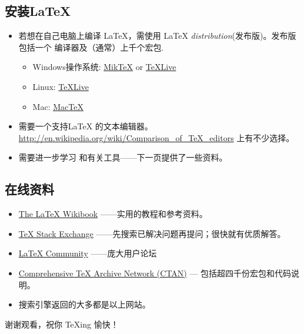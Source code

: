 \documentclass{beamer}
\begin{document}
\subsection{安装\LaTeX{}}
\begin{frame}{\insertsubsection}
\begin{itemize}
\item 若想在自己电脑上编译 \LaTeX{}，需使用 \LaTeX{}
\emph{distribution}(发布版)。发布版包括一个  编译器及（通常）上千个宏包.
\begin{itemize}
\item Windows操作系统: \href{http://miktex.org/}{Mik\TeX} or \href{http://tug.org/texlive/}{\TeX Live}
\item Linux: \href{http://tug.org/texlive/}{\TeX Live}
\item Mac: \href{http://tug.org/mactex/}{Mac\TeX}
\end{itemize}
\item 需要一个支持\LaTeX{} 的文本编辑器。\url{http://en.wikipedia.org/wiki/Comparison_of_TeX_editors} 上有不少选择。
\item 需要进一步学习  和有关工具——下一页提供了一些资料。
\end{itemize}
\end{frame}

\subsection{在线资料}
\begin{frame}{\insertsubsection}
\begin{itemize}
\item \href{http://en.wikibooks.org/wiki/LaTeX}{The \LaTeX{} Wikibook} ——实用的教程和参考资料。
\item \href{http://tex.stackexchange.com/}{\TeX{} Stack Exchange} ——先搜索已解决问题再提问；很快就有优质解答。
\item \href{http://www.latex-community.org/}{\LaTeX{} Community} ——庞大用户论坛
\item \href{http://ctan.org/}{Comprehensive \TeX{} Archive Network (CTAN)} ---
包括超四千份宏包和代码说明。
\item 搜索引擎返回的大多都是以上网站。
\end{itemize}
\end{frame}

\begin{frame}
\begin{center}
谢谢观看，祝你 \TeX{}ing 愉快！
\end{center}
\end{frame}
\end{document}
